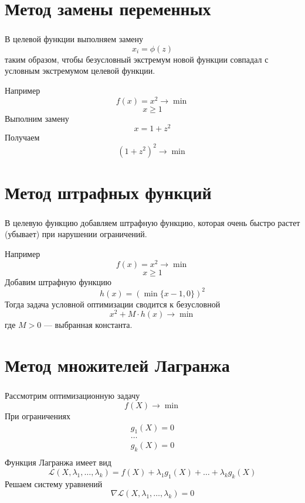 \documentclass{beamer}
\begin{document}
\section{Метод замены переменных}
\begin{frame}
	\frametitle{\insertsection}
	
    В целевой функции выполняем замену $$x_i = \phi(z)$$ таким образом, чтобы безусловный экстремум новой функции совпадал с условным экстремумом целевой функции.
    
    Например
    $$f(x) = x^2 \to \min$$
    $$x \geq 1$$
    Выполним замену $$x = 1 + z^2$$
    Получаем $$(1 + z^2)^2 \to \min$$
	
\end{frame}

\section{Метод штрафных функций}
\begin{frame}
	\frametitle{\insertsection}
	
    В целевую функцию добавляем штрафную функцию, которая очень быстро растет (убывает) при нарушении ограничений.
    
    Например
    $$f(x) = x^2 \to \min$$
    $$x \geq 1$$
    Добавим штрафную функцию $$h(x) = (\min\{x-1, 0\})^2$$
    Тогда задача условной оптимизации сводится к безусловной
    $$x^2 + M \cdot h(x) \to \min$$ где $M>0$ — выбранная константа.
	
\end{frame}

\section{Метод множителей Лагранжа}
\begin{frame}
	\frametitle{\insertsection}
	
	Рассмотрим оптимизационную задачу
	$$f(X) \to \min$$
	При ограничениях
	$$\begin{matrix}
	g_1(X) = 0\\
	\dots \\
	g_k(X) = 0 \\
	\end{matrix}$$
	Функция Лагранжа имеет вид
	$$\mathcal L(X, \lambda_1, \dots, \lambda_k) = f(X) + \lambda_1g_1(X) + \dots + \lambda_kg_k(X)$$
	Решаем систему уравнений
	$$\nabla \mathcal L(X, \lambda_1, \dots, \lambda_k) = 0$$
	
\end{frame}
\end{document}
